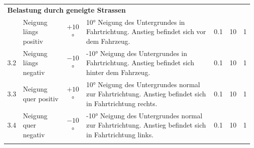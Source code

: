 \begin{landscape}
\begin{tabularx}{\linewidth}{llcXccc}
    \multicolumn{7}{l}{\textbf{Belastung durch geneigte Strassen}}\\
    \thickhline
    3.1	& Neigung längs positiv & $+10$° & 10° Neigung des Untergrundes in Fahrtrichtung. Anstieg befindet sich vor dem Fahrzeug. & 0.1 & 10 & 1\\
    3.2	& Neigung längs negativ & $-10$° & -10° Neigung des Untergrundes in Fahrtrichtung. Anstieg befindet sich hinter dem Fahrzeug. & 0.1 & 10 & 1\\
    3.3	& Neigung quer positiv  &$+10$° & 10° Neigung des Untergrundes normal zur Fahrtrichtung. Anstieg befindet sich in Fahrtrichtung rechts. & 0.1 & 10 & 1\\
    3.4	& Neigung quer negativ  &$-10$° & -10° Neigung des Untergrundes normal zur Fahrtrichtung. Anstieg befindet sich in Fahrtrichtung links. & 0.1 & 10 & 1\\

    \thickhline
  \end{tabularx}
  \label{Lastenheft A}
\end{landscape}

